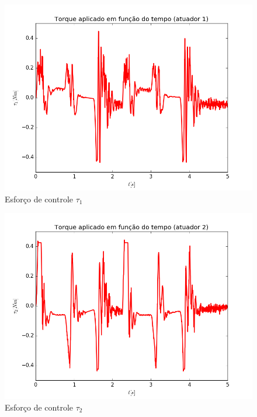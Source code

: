 \documentclass[]{politex}
\begin{document}
\begin{multicols}{2}
\begin{figure}[H]
	\centering
	\includegraphics[scale=0.39]{../../../Experimental/Aquisicoes/PIDSMCx_triangulo/tau1.png}  
	\caption{Esforço de controle $\tau_1$}
	\label{fig:PIDSMCx_triangulo_tau1}
\end{figure}
\begin{figure}[H]
	\centering
	\includegraphics[scale=0.39]{../../../Experimental/Aquisicoes/PIDSMCx_triangulo/tau2.png}  
	\caption{Esforço de controle $\tau_2$}
	\label{fig:PIDSMCx_triangulo_tau2}
\end{figure}
\end{multicols}
\end{document}
